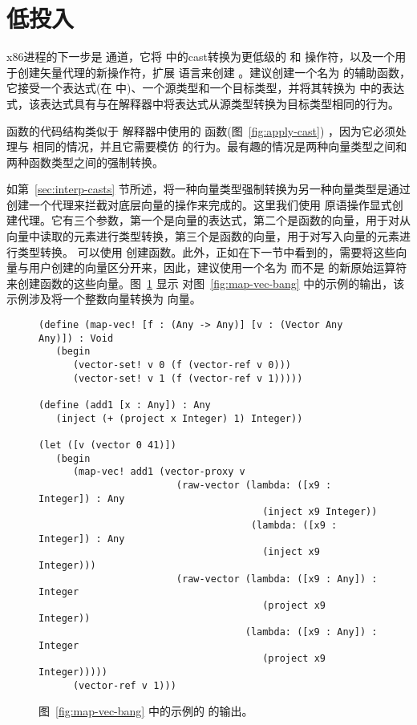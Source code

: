 \documentclass[11pt]{book}
\begin{document}
\section{低投入}
\label{sec:lower-casts}

x86进程的下一步是 
通道，它将 \LangCast{} 中的cast转换为更低级的
 和  操作符，以及一个用于创建矢量代理的新操作符，扩展 \LangLoop{} 语言来创建
\LangProxy{} 。建议创建一个名为
 的辅助函数，它接受一个表达式(在 \LangCast{} 中)、一个源类型和一个目标类型，并将其转换为 \LangProxy{} 中的表达式，该表达式具有与在解释器中将表达式从源类型转换为目标类型相同的行为。

  函数的代码结构类似于 \LangCast{} 解释器中使用的  函数(图~\ref{fig:apply-cast}) ，因为它必须处理与
 相同的情况，并且它需要模仿
 的行为。最有趣的情况是两种向量类型之间和两种函数类型之间的强制转换。

如第~\ref{sec:interp-casts} 节所述，将一种向量类型强制转换为另一种向量类型是通过创建一个代理来拦截对底层向量的操作来完成的。这里我们使用  原语操作显式创建代理。它有三个参数，第一个是向量的表达式，第二个是函数的向量，用于对从向量中读取的元素进行类型转换，第三个是函数的向量，用于对写入向量的元素进行类型转换。
可以使用  创建函数。此外，正如在下一节中看到的，需要将这些向量与用户创建的向量区分开来，因此，建议使用一个名为  而不是  的新原始运算符来创建函数的这些向量。图~\ref{fig:map-vec-bang-lower-cast} 显示  对图~\ref{fig:map-vec-bang} 中的示例的输出，该示例涉及将一个整数向量转换为  向量。

\begin{figure}[tbp]
\begin{lstlisting}
(define (map-vec! [f : (Any -> Any)] [v : (Vector Any Any)]) : Void
   (begin 
      (vector-set! v 0 (f (vector-ref v 0)))
      (vector-set! v 1 (f (vector-ref v 1)))))
  
(define (add1 [x : Any]) : Any
   (inject (+ (project x Integer) 1) Integer))

(let ([v (vector 0 41)])
   (begin 
      (map-vec! add1 (vector-proxy v
                        (raw-vector (lambda: ([x9 : Integer]) : Any
                                       (inject x9 Integer))
                                     (lambda: ([x9 : Integer]) : Any
                                       (inject x9 Integer)))
                        (raw-vector (lambda: ([x9 : Any]) : Integer
                                       (project x9 Integer))
                                    (lambda: ([x9 : Any]) : Integer
                                       (project x9 Integer)))))
      (vector-ref v 1)))
\end{lstlisting}
\caption{图~\ref{fig:map-vec-bang} 中的示例的  的输出。}
\label{fig:map-vec-bang-lower-cast}
\end{figure}
\end{document}
